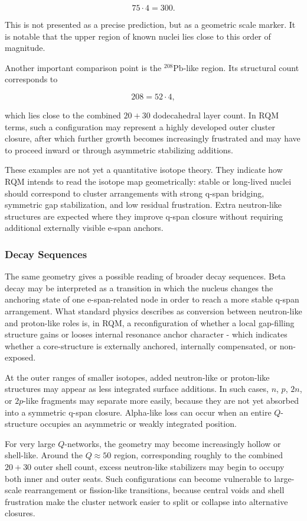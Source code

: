 \documentclass[11pt,a4paper]{article}
\begin{document}
\[
75 \cdot 4 = 300 .
\]

This is not presented as a precise prediction, but as a geometric scale marker. It is notable that the upper region of known nuclei lies close to this order of magnitude.

Another important comparison point is the \(^{208}\mathrm{Pb}\)-like region. Its structural count corresponds to

\[
208 = 52 \cdot 4 ,
\]

which lies close to the combined \(20+30\) dodecahedral layer count. In RQM terms, such a configuration may represent a highly developed outer cluster closure, after which further growth becomes increasingly frustrated and may have to proceed inward or through asymmetric stabilizing additions.

These examples are not yet a quantitative isotope theory. They indicate how RQM intends to read the isotope map geometrically: stable or long-lived nuclei should correspond to cluster arrangements with strong q-span bridging, symmetric gap stabilization, and low residual frustration. Extra neutron-like structures are expected where they improve q-span closure without requiring additional externally visible e-span anchors.


\subsubsection{Decay Sequences}

The same geometry gives a possible reading of broader decay sequences. Beta decay may be interpreted as a transition in which the nucleus changes the anchoring state of one e-span-related node in order to reach a more stable q-span arrangement. What standard physics describes as conversion between neutron-like and proton-like roles is, in RQM, a reconfiguration of whether a local gap-filling structure gains or looses internal resonance anchor character - which indicates whether a core-structure is externally anchored, internally compensated, or non-exposed.

At the outer ranges of smaller isotopes, added neutron-like or proton-like structures may appear as less integrated surface additions. In such cases, \(n\), \(p\), \(2n\), or \(2p\)-like fragments may separate more easily, because they are not yet absorbed into a symmetric q-span closure. Alpha-like loss can occur when an entire \(Q\)-structure occupies an asymmetric or weakly integrated position.

For very large \(Q\)-networks, the geometry may become increasingly hollow or shell-like. Around the \(Q\approx 50\) region, corresponding roughly to the combined \(20+30\) outer shell count, excess neutron-like stabilizers may begin to occupy both inner and outer seats. Such configurations can become vulnerable to large-scale rearrangement or fission-like transitions, because central voids and shell frustration make the cluster network easier to split or collapse into alternative closures.
\end{document}
